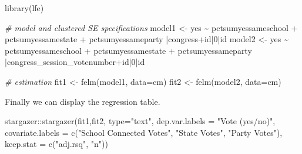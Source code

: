 \documentclass[
  12pt,
]{style/krantz}
\newenvironment{Shaded}{\begin{snugshade}}{\end{snugshade}}
\newcommand{\AttributeTok}[1]{\textcolor[rgb]{0.77,0.63,0.00}{#1}}
\newcommand{\CommentTok}[1]{\textcolor[rgb]{0.56,0.35,0.01}{\textit{#1}}}
\newcommand{\DecValTok}[1]{\textcolor[rgb]{0.00,0.00,0.81}{#1}}
\newcommand{\FunctionTok}[1]{\textcolor[rgb]{0.00,0.00,0.00}{#1}}
\newcommand{\NormalTok}[1]{#1}
\newcommand{\OtherTok}[1]{\textcolor[rgb]{0.56,0.35,0.01}{#1}}
\newcommand{\SpecialCharTok}[1]{\textcolor[rgb]{0.00,0.00,0.00}{#1}}
\newcommand{\StringTok}[1]{\textcolor[rgb]{0.31,0.60,0.02}{#1}}
\begin{document}
\begin{Shaded}
\begin{Highlighting}[]
\FunctionTok{library}\NormalTok{(lfe)}

\CommentTok{\# model and clustered SE specifications}
\NormalTok{model1 }\OtherTok{\textless{}{-}}\NormalTok{ yes }\SpecialCharTok{\textasciitilde{}}\NormalTok{ pctsumyessameschool }\SpecialCharTok{+}\NormalTok{ pctsumyessamestate }\SpecialCharTok{+}\NormalTok{ pctsumyessameparty }\SpecialCharTok{|}\NormalTok{congress}\SpecialCharTok{+}\NormalTok{id}\SpecialCharTok{|}\DecValTok{0}\SpecialCharTok{|}\NormalTok{id}
\NormalTok{model2 }\OtherTok{\textless{}{-}}\NormalTok{ yes }\SpecialCharTok{\textasciitilde{}}\NormalTok{ pctsumyessameschool }\SpecialCharTok{+}\NormalTok{ pctsumyessamestate }\SpecialCharTok{+}\NormalTok{ pctsumyessameparty }\SpecialCharTok{|}\NormalTok{congress\_session\_votenumber}\SpecialCharTok{+}\NormalTok{id}\SpecialCharTok{|}\DecValTok{0}\SpecialCharTok{|}\NormalTok{id}

\CommentTok{\# estimation}
\NormalTok{fit1 }\OtherTok{\textless{}{-}} \FunctionTok{felm}\NormalTok{(model1, }\AttributeTok{data=}\NormalTok{cm)}
\NormalTok{fit2 }\OtherTok{\textless{}{-}} \FunctionTok{felm}\NormalTok{(model2, }\AttributeTok{data=}\NormalTok{cm)}
\end{Highlighting}
\end{Shaded}

Finally we can display the regression table.

\begin{Shaded}
\begin{Highlighting}[]
\NormalTok{stargazer}\SpecialCharTok{::}\FunctionTok{stargazer}\NormalTok{(fit1,fit2,}
                     \AttributeTok{type=}\StringTok{"text"}\NormalTok{,}
                     \AttributeTok{dep.var.labels =} \StringTok{"Vote (yes/no)"}\NormalTok{,}
                     \AttributeTok{covariate.labels =} \FunctionTok{c}\NormalTok{(}\StringTok{"School Connected Votes"}\NormalTok{,}
                                          \StringTok{"State Votes"}\NormalTok{,}
                                          \StringTok{"Party Votes"}\NormalTok{),}
                     \AttributeTok{keep.stat =} \FunctionTok{c}\NormalTok{(}\StringTok{"adj.rsq"}\NormalTok{, }\StringTok{"n"}\NormalTok{))}
\end{Highlighting}
\end{Shaded}
\end{document}
